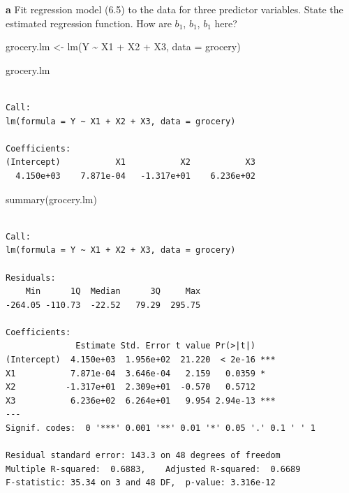 \documentclass[
  letterpaper,
  DIV=11,
  numbers=noendperiod]{scrartcl}
\newenvironment{Shaded}{\begin{snugshade}}{\end{snugshade}}
\newcommand{\AttributeTok}[1]{\textcolor[rgb]{0.40,0.45,0.13}{#1}}
\newcommand{\FunctionTok}[1]{\textcolor[rgb]{0.28,0.35,0.67}{#1}}
\newcommand{\NormalTok}[1]{\textcolor[rgb]{0.00,0.23,0.31}{#1}}
\newcommand{\OtherTok}[1]{\textcolor[rgb]{0.00,0.23,0.31}{#1}}
\newcommand{\SpecialCharTok}[1]{\textcolor[rgb]{0.37,0.37,0.37}{#1}}
\begin{document}
\textbf{a} Fit regression model (6.5) to the data for three predictor
variables. State the estimated regression function. How are \(b_{1}\),
\(b_{1}\), \(b_{1}\) here?

\begin{Shaded}
\begin{Highlighting}[]
\NormalTok{grocery.lm }\OtherTok{\textless{}{-}} \FunctionTok{lm}\NormalTok{(Y }\SpecialCharTok{\textasciitilde{}}\NormalTok{ X1 }\SpecialCharTok{+}\NormalTok{ X2 }\SpecialCharTok{+}\NormalTok{ X3, }\AttributeTok{data =}\NormalTok{ grocery)}
\end{Highlighting}
\end{Shaded}

\begin{Shaded}
\begin{Highlighting}[]
\NormalTok{grocery.lm}
\end{Highlighting}
\end{Shaded}

\begin{verbatim}

Call:
lm(formula = Y ~ X1 + X2 + X3, data = grocery)

Coefficients:
(Intercept)           X1           X2           X3  
  4.150e+03    7.871e-04   -1.317e+01    6.236e+02  
\end{verbatim}

\begin{Shaded}
\begin{Highlighting}[]
\FunctionTok{summary}\NormalTok{(grocery.lm)}
\end{Highlighting}
\end{Shaded}

\begin{verbatim}

Call:
lm(formula = Y ~ X1 + X2 + X3, data = grocery)

Residuals:
    Min      1Q  Median      3Q     Max 
-264.05 -110.73  -22.52   79.29  295.75 

Coefficients:
              Estimate Std. Error t value Pr(>|t|)    
(Intercept)  4.150e+03  1.956e+02  21.220  < 2e-16 ***
X1           7.871e-04  3.646e-04   2.159   0.0359 *  
X2          -1.317e+01  2.309e+01  -0.570   0.5712    
X3           6.236e+02  6.264e+01   9.954 2.94e-13 ***
---
Signif. codes:  0 '***' 0.001 '**' 0.01 '*' 0.05 '.' 0.1 ' ' 1

Residual standard error: 143.3 on 48 degrees of freedom
Multiple R-squared:  0.6883,    Adjusted R-squared:  0.6689 
F-statistic: 35.34 on 3 and 48 DF,  p-value: 3.316e-12
\end{verbatim}
\end{document}
